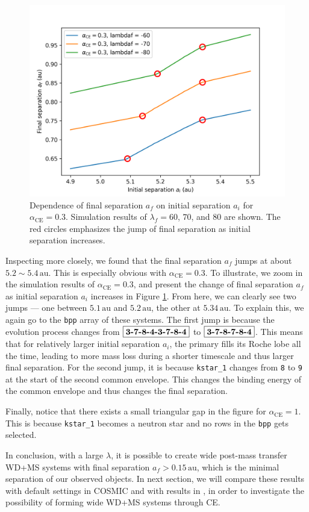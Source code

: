 \documentclass[12pt]{article}
\newcommand{\alphace}{\alpha_{\mathrm{CE}}}
\newcommand{\au}{\, \mathrm{au}}
\begin{document}
\begin{figure}
  \centering
  \includegraphics[width = 0.6\linewidth]{fig/jump-zoom.png}
  \caption{Dependence of final separation $a_f$ on initial separation $a_i$ for $\alphace = 0.3$. Simulation results of $\lambda_f = 60$, $70$, and $80$ are shown. The red circles emphasizes the jump of final separation as initial separation increases.}
  \label{jump-zoom}
\end{figure}

Inspecting more closely, we found that the final separation $a_f$ jumps at about $5.2 \sim 5.4 \au$. This is especially obvious with $\alphace = 0.3$. To illustrate, we zoom in the simulation results of $\alphace = 0.3$, and present the change of final separation $a_f$ as initial separation $a_i$ increases in Figure \ref{jump-zoom}. From here, we can clearly see two jumps — one between $5.1\au$ and $5.2\au$, the other at $5.34\au$. To explain this, we again go to the \verb|bpp| array of these systems. The first jump is because the evolution process changes from $\boxed{\text{\textbf{3-7-8-4-3-7-8-4}}}$ to $\boxed{\text{\textbf{3-7-8-7-8-4}}}$. This means that for relatively larger initial separation $a_i$, the primary fills its Roche lobe all the time, leading to more mass loss during a shorter timescale and thus larger final separation. For the second jump, it is because \verb|kstar_1| changes from \verb|8| to \verb|9| at the start of the second common envelope. This changes the binding energy of the common envelope and thus changes the final separation.

Finally, notice that there exists a small triangular gap in the figure for $\alphace = 1$. This is because \verb|kstar_1| becomes a neutron star and no rows in the \verb|bpp| gets selected.

In conclusion, with a large $\lambda$, it is possible to create wide post-mass transfer WD+MS systems with final separation $a_f > 0.15 \au$, which is the minimal separation of our observed objects. In next section, we will compare these results with default settings in COSMIC and with results in \cite{yamaguchi_hi}, in order to investigate the possibility of forming wide WD+MS systems through CE.
\end{document}
